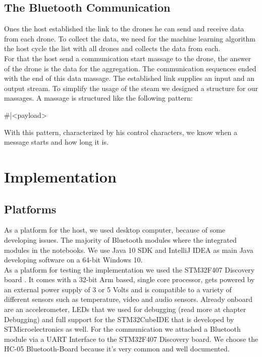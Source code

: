 \subsection{The Bluetooth Communication}

Ones the host established the link to the drones he can send and receive data from each drone. To collect the data, we need for the machine learning algorithm the host cycle the list with all drones and collects the data from each. \\
For that the host send a communication start massage to the drone, the answer of the drone is the data for the aggregation. The communication sequences ended with the end of this data massage. The established link supplies an input and an output stream. To simplify the usage of the steam we designed a structure for our massages. A massage is structured like the following pattern:
\begin{center}
    \#<length of the payload>|<payload>
\end{center}
With this pattern, characterized by his control characters, we know when a message starts and how long it is.



\section{Implementation}

\subsection{Platforms}
As a platform for the host, we used desktop computer, because of some developing issues. The majority of Bluetooth modules where the integrated modules in the notebooks. We use Java 10 SDK and IntelliJ IDEA as main Java developing software on a 64-bit Windows 10. \\

As a platform for testing the implementation we used the STM32F407 Discovery board \cite{STM32}. It comes with a 32-bit Arm based, single core processor, gets powered by an external power supply of 3 or 5 Volts and is compatible to a variety of different sensors such as temperature, video and audio sensors. Already onboard are an accelerometer, LEDs that we used for debugging (read more at chapter Debugging) and full support for the STM32CubeIDE that is developed by STMicroelectronics as well. 
For the communication we attached a Bluetooth module via a UART Interface to the STM32F407 Discovery board. We choose the HC-05 Bluetooth-Board because it’s very common and well documented. 

